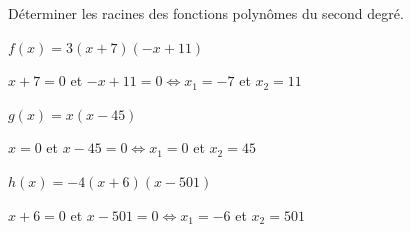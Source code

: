 \documentclass[12pt,a4paper]{article}  %
\begin{document}
\begin{center}

\end{center}






Déterminer les racines des fonctions polynômes du second degré.
\begin{enumMet}
    \item {} $f(x)=3(x+7)(-x+11)$\\
    \begin{corrBox}
        $x+7=0$ et $-x+11=0 \iff x_1=-7$ et $x_2=11$
    \end{corrBox}
    \item $g(x)=x(x-45)$\\
    \begin{corrBox}
        $x=0$ et $x-45=0 \iff x_1=0$ et $x_2=45$
    \end{corrBox}
    \item $h(x)=-4(x+6)(x-501)$\\
    \begin{corrBox}
        $ x+6=0$ et $x-501=0 \iff x_1=-6$ et $x_2=501$
    \end{corrBox}
\end{enumMet}
\end{document}
